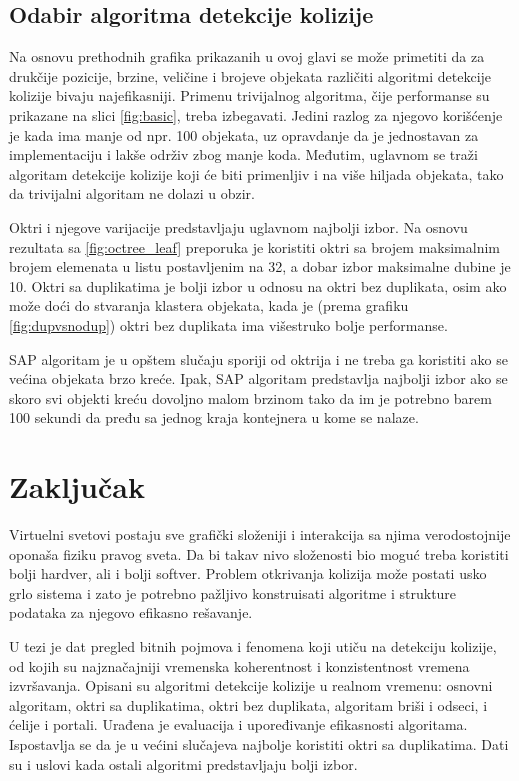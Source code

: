 \documentclass[12pt,oneside]{memoir}
\begin{document}
\section{Odabir algoritma detekcije kolizije}

Na osnovu prethodnih grafika prikazanih u ovoj glavi se može primetiti da za drukčije
pozicije, brzine, veličine i brojeve objekata različiti algoritmi detekcije kolizije bivaju najefikasniji.
Primenu trivijalnog algoritma, čije performanse su prikazane na slici \ref{fig:basic}, treba izbegavati.
Jedini razlog za njegovo korišćenje je kada ima manje od npr. 100 objekata,
uz opravdanje da je jednostavan za implementaciju i lakše održiv zbog manje koda.
Međutim, uglavnom se traži algoritam detekcije kolizije koji će biti primenljiv i na više hiljada objekata,
tako da trivijalni algoritam ne dolazi u obzir.

Oktri i njegove varijacije predstavljaju uglavnom najbolji izbor.
Na osnovu rezultata sa \ref{fig:octree_leaf} preporuka je koristiti oktri sa brojem maksimalnim brojem elemenata u listu 
postavljenim na 32, a dobar izbor maksimalne dubine je 10. 
Oktri sa duplikatima je bolji izbor u odnosu na oktri bez duplikata, osim ako može doći do stvaranja klastera objekata, kada
je (prema grafiku \ref{fig:dupvsnodup}) oktri bez duplikata ima višestruko bolje performanse.

SAP algoritam je u opštem slučaju sporiji od oktrija i ne treba ga koristiti ako se većina objekata 
brzo kreće.
Ipak, SAP algoritam predstavlja najbolji izbor ako se skoro svi objekti kreću dovoljno malom brzinom 
tako da im je potrebno barem 100 sekundi da pređu sa jednog kraja kontejnera u kome se nalaze.


\chapter{Zaključak}
\label{sec:zakljucak}

Virtuelni svetovi postaju sve  grafički složeniji i  interakcija sa njima verodostojnije oponaša fiziku pravog sveta.
Da bi takav nivo složenosti bio moguć treba koristiti bolji hardver, ali i bolji softver. 
Problem otkrivanja kolizija može postati usko grlo sistema i zato je potrebno pažljivo konstruisati 
algoritme i strukture podataka za njegovo efikasno rešavanje.

U tezi je dat pregled bitnih pojmova i fenomena koji utiču na detekciju kolizije, 
od kojih su najznačajniji vremenska koherentnost i konzistentnost vremena izvršavanja.
Opisani su algoritmi detekcije kolizije u realnom vremenu: osnovni algoritam, oktri sa duplikatima, oktri bez duplikata,
algoritam briši i odseci, i ćelije i portali. 
Urađena je evaluacija i upoređivanje efikasnosti algoritama.
Ispostavlja se da je u većini slučajeva najbolje koristiti oktri sa duplikatima.
Dati su i uslovi kada ostali algoritmi predstavljaju bolji izbor.
\end{document}
